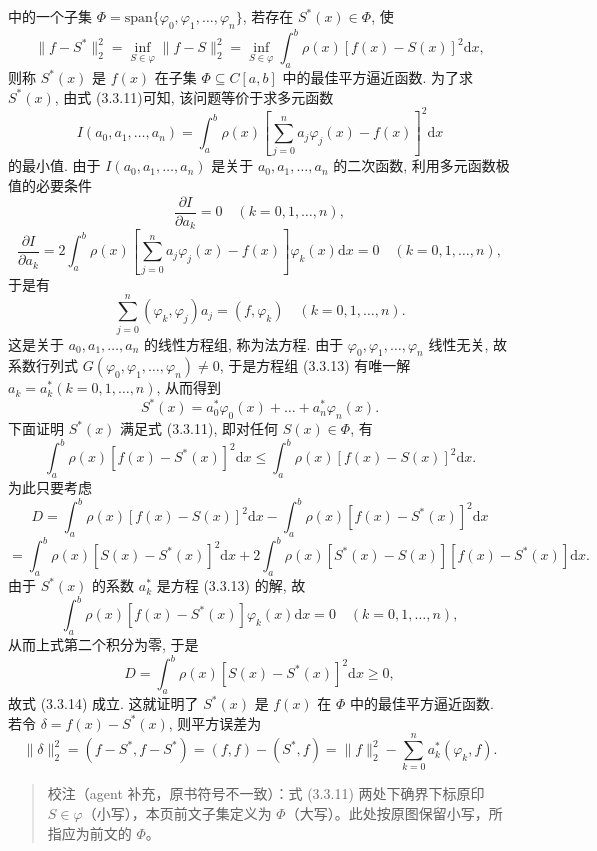 \documentclass[
  10pt,
  fontset=fandol]{ctexart}
\begin{document}
中的一个子集 \(\Phi = \text{span}\{\varphi_0, \varphi_1, \dots, \varphi_n\}\), 若存在 \(S^*(x) \in \Phi\), 使 \[
\| f - S^* \|_2^2 = \inf_{S \in \varphi} \| f - S \|_2^2 = \inf_{S \in \varphi} \int_a^b \rho(x) [f(x) - S(x)]^2 \mathrm{d}x, \tag{3.3.11}
\] 则称 \(S^*(x)\) 是 \(f(x)\) 在子集 \(\Phi \subseteq C[a, b]\) 中的最佳平方逼近函数. 为了求 \(S^*(x)\), 由式 (3.3.11)可知, 该问题等价于求多元函数 \[
I(a_0, a_1, \dots, a_n) = \int_a^b \rho(x) \left[ \sum_{j=0}^n a_j \varphi_j(x) - f(x) \right]^2 \mathrm{d}x \tag{3.3.12}
\] 的最小值. 由于 \(I(a_0, a_1, \dots, a_n)\) 是关于 \(a_0, a_1, \dots, a_n\) 的二次函数, 利用多元函数极值的必要条件 \[
\frac{\partial I}{\partial a_k} = 0 \quad (k = 0, 1, \dots, n),
\] \[
\frac{\partial I}{\partial a_k} = 2 \int_a^b \rho(x) \left[ \sum_{j=0}^n a_j \varphi_j(x) - f(x) \right] \varphi_k(x) \mathrm{d}x = 0 \quad (k = 0, 1, \dots, n),
\] 于是有 \[
\sum_{j=0}^n (\varphi_k, \varphi_j) a_j = (f, \varphi_k) \quad (k = 0, 1, \dots, n). \tag{3.3.13}
\] 这是关于 \(a_0, a_1, \dots, a_n\) 的线性方程组, 称为法方程. 由于 \(\varphi_0, \varphi_1, \dots, \varphi_n\) 线性无关, 故系数行列式 \(G(\varphi_0, \varphi_1, \dots, \varphi_n) \neq 0\), 于是方程组 (3.3.13) 有唯一解 \(a_k = a_k^* (k = 0, 1, \dots, n)\), 从而得到 \[
S^*(x) = a_0^* \varphi_0(x) + \dots + a_n^* \varphi_n(x).
\] 下面证明 \(S^*(x)\) 满足式 (3.3.11), 即对任何 \(S(x) \in \Phi\), 有 \[
\int_a^b \rho(x) [f(x) - S^*(x)]^2 \mathrm{d}x \leqslant \int_a^b \rho(x) [f(x) - S(x)]^2 \mathrm{d}x. \tag{3.3.14}
\] 为此只要考虑 \[
D = \int_a^b \rho(x) [f(x) - S(x)]^2 \mathrm{d}x - \int_a^b \rho(x) [f(x) - S^*(x)]^2 \mathrm{d}x
\] \[
= \int_a^b \rho(x) [S(x) - S^*(x)]^2 \mathrm{d}x + 2 \int_a^b \rho(x) [S^*(x) - S(x)] [f(x) - S^*(x)] \mathrm{d}x.
\] 由于 \(S^*(x)\) 的系数 \(a_k^*\) 是方程 (3.3.13) 的解, 故 \[
\int_a^b \rho(x) [f(x) - S^*(x)] \varphi_k(x) \mathrm{d}x = 0 \quad (k = 0, 1, \dots, n),
\] 从而上式第二个积分为零, 于是 \[
D = \int_a^b \rho(x) [S(x) - S^*(x)]^2 \mathrm{d}x \geqslant 0,
\] 故式 (3.3.14) 成立. 这就证明了 \(S^*(x)\) 是 \(f(x)\) 在 \(\Phi\) 中的最佳平方逼近函数. 若令 \(\delta = f(x) - S^*(x)\), 则平方误差为 \[
\|\delta\|_2^2 = (f - S^*, f - S^*) = (f, f) - (S^*, f) = \|f\|_2^2 - \sum_{k=0}^n a_k^* (\varphi_k, f). \tag{3.3.15}
\]

\begin{quote}
校注（agent 补充，原书符号不一致）：式 (3.3.11) 两处下确界下标原印 \(S\in\varphi\)（小写），本页前文子集定义为 \(\Phi\)（大写）。此处按原图保留小写，所指应为前文的 \(\Phi\)。
\end{quote}
\end{document}
